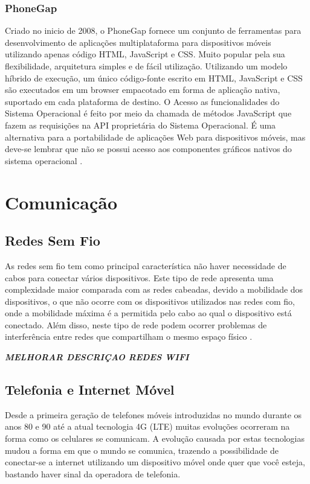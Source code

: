 \subsubsection{PhoneGap}
Criado no inicio de 2008, o PhoneGap fornece um conjunto de ferramentas para desenvolvimento de aplicações multiplataforma para dispositivos móveis utilizando apenas código HTML, JavaScript e CSS. Muito popular pela sua flexibilidade, arquitetura simples e de fácil utilização. Utilizando um modelo híbrido de execução, um único código-fonte escrito em HTML, JavaScript e CSS são executados em um browser empacotado em forma de aplicação nativa, suportado em cada plataforma de destino. O Acesso as funcionalidades do Sistema Operacional é feito por meio da chamada de métodos JavaScript que fazem as requisições na API proprietária do Sistema Operacional. É uma alternativa para a portabilidade de aplicações Web para dispositivos móveis, mas deve-se lembrar que não se possui acesso aos componentes gráficos nativos do sistema operacional
\cite{CrossPlatformMobileDevelopment2011}.

\section{Comunicação}

\subsection{Redes Sem Fio}
As redes sem fio tem como principal característica não haver necessidade de cabos para conectar vários dispositivos. Este tipo de rede apresenta uma complexidade maior comparada com as redes cabeadas, devido a mobilidade dos dispositivos, o que não ocorre com os dispositivos utilizados nas redes com fio, onde a mobilidade máxima é a permitida pelo cabo ao qual o dispositivo está conectado. Além disso, neste tipo de rede podem ocorrer problemas de interferência entre redes que compartilham o mesmo espaço físico 
\cite{IEEE80211}.

\emph{\bf{MELHORAR DESCRIÇAO REDES WIFI}}

\subsection{Telefonia e Internet Móvel}
Desde a primeira geração de telefones móveis introduzidas no mundo durante os anos 80 e 90  até a atual tecnologia 4G (LTE) muitas evoluções ocorreram na forma como os celulares se comunicam. A evolução causada por estas tecnologias mudou a forma em que o mundo se comunica, trazendo a possibilidade de conectar-se a internet utilizando um dispositivo móvel onde quer que você esteja, bastando haver sinal da operadora de telefonia.

